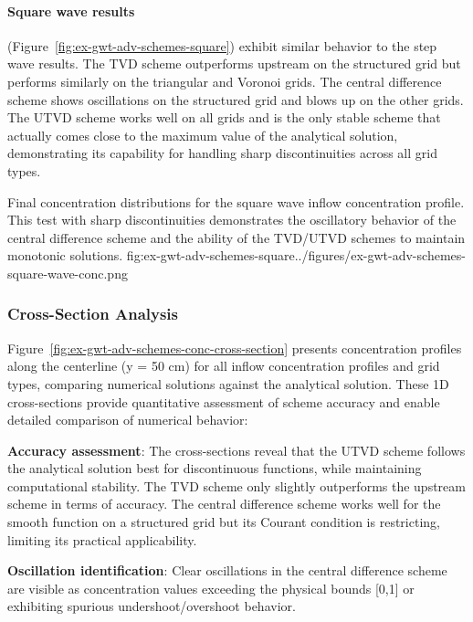 \paragraph{Square wave results} (Figure~\ref{fig:ex-gwt-adv-schemes-square}) exhibit similar behavior to the step wave results. The TVD scheme outperforms upstream on the structured grid but performs similarly on the triangular and Voronoi grids. The central difference scheme shows oscillations on the structured grid and blows up on the other grids. The UTVD scheme works well on all grids and is the only stable scheme that actually comes close to the maximum value of the analytical solution, demonstrating its capability for handling sharp discontinuities across all grid types.
\begin{StandardFigure}{
    Final concentration distributions for the square wave inflow concentration profile. This test with sharp discontinuities demonstrates the oscillatory behavior of the central difference scheme and the ability of the TVD/UTVD schemes to maintain monotonic solutions.
}{fig:ex-gwt-adv-schemes-square}{../figures/ex-gwt-adv-schemes-square-wave-conc.png}
\end{StandardFigure}

\subsubsection{Cross-Section Analysis}

Figure~\ref{fig:ex-gwt-adv-schemes-conc-cross-section} presents concentration profiles along the centerline (y = 50 cm) for all inflow concentration profiles and grid types, comparing numerical solutions against the analytical solution. These 1D cross-sections provide quantitative assessment of scheme accuracy and enable detailed comparison of numerical behavior:

\textbf{Accuracy assessment}: The cross-sections reveal that the UTVD scheme follows the analytical solution best for discontinuous functions, while maintaining computational stability. The TVD scheme only slightly outperforms the upstream scheme in terms of accuracy. The central difference scheme works well for the smooth function on a structured grid but its Courant condition is restricting, limiting its practical applicability.

\textbf{Oscillation identification}: Clear oscillations in the central difference scheme are visible as concentration values exceeding the physical bounds [0,1] or exhibiting spurious undershoot/overshoot behavior.

